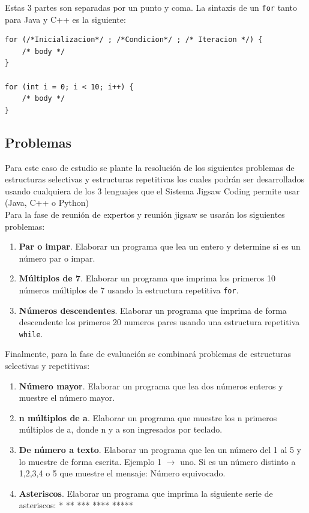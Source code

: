 Estas 3 partes son separadas por un punto y coma. La sintaxis de un \texttt{for} tanto para Java y C++ es la siguiente:

\begin{lstlisting}
for (/*Inicializacion*/ ; /*Condicion*/ ; /* Iteracion */) {
	/* body */
}

for (int i = 0; i < 10; i++) {
	/* body */
}
\end{lstlisting}


\subsection{Problemas}
\label{sec:problemas}
Para este caso de estudio se plante la resolución de los siguientes problemas de estructuras selectivas y estructuras repetitivas los cuales podrán ser desarrollados usando cualquiera de los 3 lenguajes que el Sistema Jigsaw Coding permite usar (Java, C++ o Python)\\

Para la fase de reunión de expertos y reunión jigsaw se usarán los siguientes problemas:

\begin{enumerate}
	\item \textbf{Par o impar}. Elaborar un programa que lea un entero y determine si es un número par o impar.
	\item \textbf{Múltiplos de 7}. Elaborar un programa que imprima los primeros 10 números múltiplos de 7 usando la estructura repetitiva \texttt{for}.
	\item \textbf{Números descendentes}. Elaborar un programa que imprima de forma descendente los primeros 20 numeros pares usando una estructura repetitiva \texttt{while}.
\end{enumerate}

Finalmente, para la fase de evaluación se combinará problemas de estructuras selectivas y repetitivas:

\begin{enumerate}
 	\item \textbf{Número mayor}. Elaborar un programa que lea dos números enteros y muestre el número mayor.
 	\item \textbf{n múltiplos de a}. Elaborar un programa que muestre los n primeros múltiplos de a, donde n y a son ingresados por teclado.
 	\item \textbf{De número a texto}. Elaborar un programa que lea un número del 1 al 5 y lo muestre de forma escrita. Ejemplo 1 $\longrightarrow$ uno. Si es un número distinto a 1,2,3,4 o 5 que muestre el mensaje: Número equivocado.
 	\item \textbf{Asteriscos}. Elaborar un programa que imprima la siguiente serie de asteriscos: \newline 	
 		\hbox{*} \newline
 		\hbox{**} \newline
 		\hbox{***} \newline
 		\hbox{****} \newline
 		\hbox{*****} 	
\end{enumerate}

